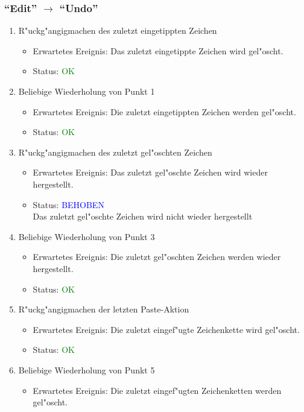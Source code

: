 \subsubsection{"`Edit"' $\rightarrow$ "`Undo"'}
\begin{enumerate}
\item R"uckg"angigmachen des zuletzt eingetippten Zeichen
\begin{itemize}
\item Erwartetes Ereignis: Das zuletzt eingetippte Zeichen wird gel"oscht. 
\item Status: \textcolor{green}{OK}
\end{itemize}
\item Beliebige Wiederholung von Punkt 1
\begin{itemize}
\item Erwartetes Ereignis: Die zuletzt eingetippten Zeichen werden gel"oscht. 
\item Status: \textcolor{green}{OK}
\end{itemize}
\item R"uckg"angigmachen des zuletzt gel"oschten Zeichen
\begin{itemize}
\item Erwartetes Ereignis: Das zuletzt gel"oschte Zeichen wird wieder hergestellt. 
\item Status: \textcolor{blue}{BEHOBEN} \\
Das zuletzt gel"oschte Zeichen wird nicht wieder hergestellt
\end{itemize}
\item Beliebige Wiederholung von Punkt 3
\begin{itemize}
\item Erwartetes Ereignis: Die zuletzt gel"oschten Zeichen werden wieder hergestellt. 
\item Status: \textcolor{green}{OK}
\end{itemize}
\item R"uckg"angigmachen der letzten Paste-Aktion
\begin{itemize}
\item Erwartetes Ereignis: Die zuletzt eingef"ugte Zeichenkette wird gel"oscht. 
\item Status: \textcolor{green}{OK}
\end{itemize}
\item Beliebige Wiederholung von Punkt 5
\begin{itemize}
\item Erwartetes Ereignis: Die zuletzt eingef"ugten Zeichenketten werden gel"oscht. 

\end{itemize}
\end{enumerate}
